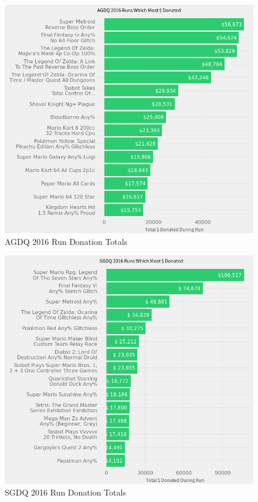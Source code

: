 \documentclass[journal]{IEEEtran}
\begin{document}
\begin{figure}
	\centering
	\includegraphics[scale=0.4]{A2016Runs}
	\caption{AGDQ 2016 Run Donation Totals}
\end{figure}

\begin{figure}
	\centering
	\includegraphics[scale=0.4]{S2016Runs}
	\caption{SGDQ 2016 Run Donation Totals}
\end{figure}
\end{document}
